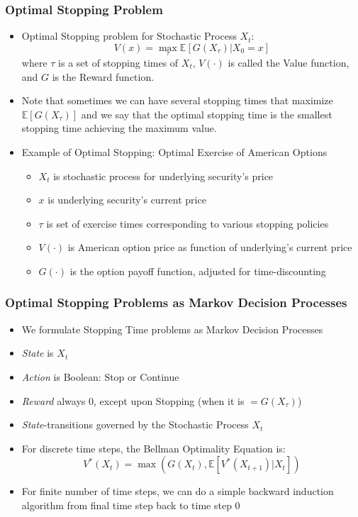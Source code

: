 \documentclass[handout]{beamer}
\begin{document}
\begin{frame}
\frametitle{Optimal Stopping Problem}
\pause
\begin{itemize}[<+->]
\item Optimal Stopping problem for Stochastic Process $X_t$: 
$$V(x) = \max_{\tau} \mathbb{E}[G(X_{\tau})|X_0 = x]$$
 where $\tau$ is a set of stopping times of $X_t$, $V(\cdot)$ is called the Value function, and $G$ is the Reward function.
\item Note that sometimes we can have several stopping times that maximize $\mathbb{E}[G(X_{\tau})]$ and we say that the optimal stopping time
is the smallest stopping time achieving the maximum value.
\item Example of Optimal Stopping: Optimal Exercise of American Options
\begin{itemize}
\item $X_t$ is stochastic process for underlying security's price
\item $x$ is underlying security's current price
\item $\tau$ is set of exercise times corresponding to various stopping policies
\item $V(\cdot)$ is American option price as function of underlying's current price
\item $G(\cdot)$ is the option payoff function, adjusted for time-discounting
\end{itemize}
\end{itemize}
\end{frame}


\begin{frame}
\frametitle{Optimal Stopping Problems as Markov Decision Processes}
\pause
\begin{itemize}[<+->]
\item We formulate Stopping Time problems as Markov Decision Processes
\item {\em State} is $X_t$
\item {\em Action} is Boolean: Stop or Continue
\item {\em Reward} always 0, except upon Stopping (when it is $=G(X_{\tau})$)
\item {\em State}-transitions governed by the Stochastic Process $X_t$
\item For discrete time steps, the Bellman Optimality Equation is:
$$V^*(X_t) = \max(G(X_t), \mathbb{E}[V^*(X_{t+1})|X_t])$$
\item For finite number of time steps, we can do a simple backward induction algorithm from final time step back to time step 0
\end{itemize}
\end{frame}
\end{document}
